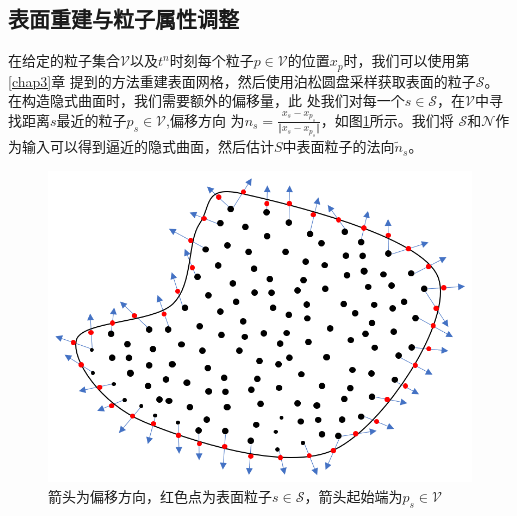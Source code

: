 \subsection{表面重建与粒子属性调整}
在给定的粒子集合$\mathcal{V}$以及$t^n$时刻每个粒子$p \in \mathcal{V}$的位置$x_p$时，我们可以使用第\ref{chap3}章
提到的方法重建表面网格，然后使用泊松圆盘采样获取表面的粒子$\mathcal{S}$。在构造隐式曲面时，我们需要额外的偏移量，此
处我们对每一个$s\in \mathcal{S}$，在$\mathcal{V}$中寻找距离$s$最近的粒子$p_s \in \mathcal{V}$,偏移方向
为$n_s = \frac{x_s - x_{p_s}}{\Vert x_s - x_{p_s} \Vert}$，如图\ref{fig: offset of surface particle}所示。我们将
$\mathcal{S}$和$\mathcal{N}$作为输入可以得到逼近的隐式曲面，然后估计$S$中表面粒子的法向$\tilde{n}_s$。
\begin{figure}[htbp]
    \centering
    \includegraphics[scale=0.7]{./images/image15.png}
    \caption[表面粒子定向估计]{箭头为偏移方向，红色点为表面粒子$s\in \mathcal{S}$，箭头起始端为$p_s \in\mathcal{V}$}
    \label{fig: offset of surface particle}
\end{figure}

